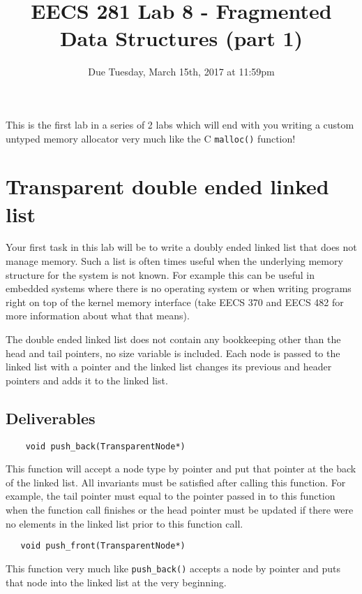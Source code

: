 \documentclass{article}
\begin{document}
\title{\textbf{EECS 281 Lab 8 - Fragmented Data Structures (part 1)}}
\author{Due Tuesday, March 15th, 2017 at 11:59pm}
\date{}
\maketitle
{}
{
   \pagestyle{empty}
}
\thispagestyle{firststyle}

This is the first lab in a series of 2 labs which will end with you writing a
custom untyped memory allocator very much like the C \texttt{malloc()} function!

\section{Transparent double ended linked list}
Your first task in this lab will be to write a doubly ended linked list that
does not manage memory.  Such a list is often times useful when the underlying
memory structure for the system is not known.  For example this can be useful
in embedded systems where there is no operating system or when writing
programs right on top of the kernel memory interface (take EECS 370 and EECS
482 for more information about what that means).

The double ended linked list does not contain any bookkeeping other than the
head and tail pointers, no size variable is included.  Each node is passed to
the linked list with a pointer and the linked list changes its previous and
header pointers and adds it to the linked list.

\subsection{Deliverables}

\begin{lstlisting}
    void push_back(TransparentNode*)
\end{lstlisting}
This function will accept a node type by pointer and put that pointer at the
back of the linked list.  All invariants must be satisfied after calling this
function.  For example, the tail pointer must equal to the pointer passed in
to this function when the function call finishes or the head pointer must be
updated if there were no elements in the linked list prior to this function
call.

\begin{lstlisting}
   void push_front(TransparentNode*)
\end{lstlisting}
This function very much like \texttt{push\_back()} accepts a node by pointer
and puts that node into the linked list at the very beginning.
\end{document}
